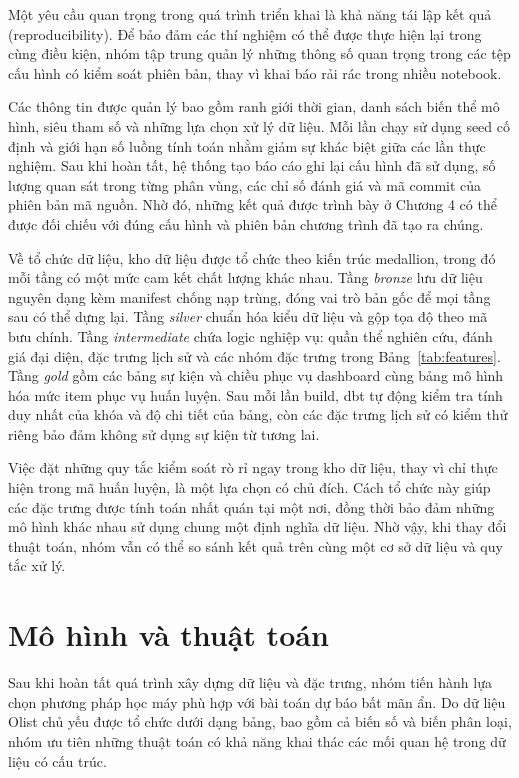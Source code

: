 \documentclass[12pt,a4paper]{report}
\begin{document}
Một yêu cầu quan trọng trong quá trình triển khai là khả năng tái lập kết quả (reproducibility). Để bảo đảm các thí nghiệm có thể được thực hiện lại trong cùng điều kiện, nhóm tập trung quản lý những thông số quan trọng trong các tệp cấu hình có kiểm soát phiên bản, thay vì khai báo rải rác trong nhiều notebook.

Các thông tin được quản lý bao gồm ranh giới thời gian, danh sách biến thể mô hình, siêu tham số và những lựa chọn xử lý dữ liệu. Mỗi lần chạy sử dụng seed cố định và giới hạn số luồng tính toán nhằm giảm sự khác biệt giữa các lần thực nghiệm. Sau khi hoàn tất, hệ thống tạo báo cáo ghi lại cấu hình đã sử dụng, số lượng quan sát trong từng phân vùng, các chỉ số đánh giá và mã commit của phiên bản mã nguồn. Nhờ đó, những kết quả được trình bày ở Chương 4 có thể được đối chiếu với đúng cấu hình và phiên bản chương trình đã tạo ra chúng.

Về tổ chức dữ liệu, kho dữ liệu được tổ chức theo kiến trúc medallion, trong đó mỗi tầng có một mức cam kết chất lượng khác nhau. Tầng \emph{bronze} lưu dữ liệu nguyên dạng kèm manifest chống nạp trùng, đóng vai trò bản gốc để mọi tầng sau có thể dựng lại. Tầng \emph{silver} chuẩn hóa kiểu dữ liệu và gộp tọa độ theo mã bưu chính. Tầng \emph{intermediate} chứa logic nghiệp vụ: quần thể nghiên cứu, đánh giá đại diện, đặc trưng lịch sử và các nhóm đặc trưng trong Bảng~\ref{tab:features}. Tầng \emph{gold} gồm các bảng sự kiện và chiều phục vụ dashboard cùng bảng mô hình hóa mức item phục vụ huấn luyện. Sau mỗi lần build, dbt tự động kiểm tra tính duy nhất của khóa và độ chi tiết của bảng, còn các đặc trưng lịch sử có kiểm thử riêng bảo đảm không sử dụng sự kiện từ tương lai. 

Việc đặt những quy tắc kiểm soát rò rỉ ngay trong kho dữ liệu, thay vì chỉ thực hiện trong mã huấn luyện, là một lựa chọn có chủ đích. Cách tổ chức này giúp các đặc trưng được tính toán nhất quán tại một nơi, đồng thời bảo đảm những mô hình khác nhau sử dụng chung một định nghĩa dữ liệu. Nhờ vậy, khi thay đổi thuật toán, nhóm vẫn có thể so sánh kết quả trên cùng một cơ sở dữ liệu và quy tắc xử lý.

\section{Mô hình và thuật toán}\label{sec:models}

Sau khi hoàn tất quá trình xây dựng dữ liệu và đặc trưng, nhóm tiến hành lựa chọn phương pháp học máy phù hợp với bài toán dự báo bất mãn ẩn. Do dữ liệu Olist chủ yếu được tổ chức dưới dạng bảng, bao gồm cả biến số và biến phân loại, nhóm ưu tiên những thuật toán có khả năng khai thác các mối quan hệ trong dữ liệu có cấu trúc.
\end{document}
